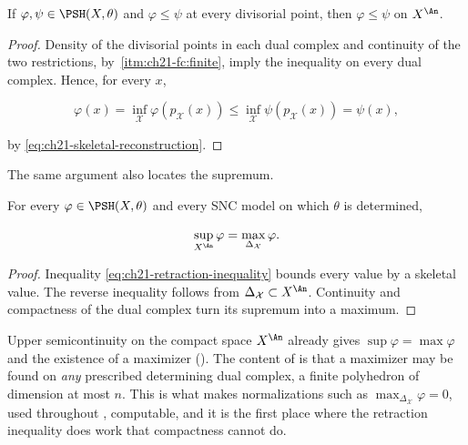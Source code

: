 \begin{proposition}\label{prop:ch21-divisorial-order}
If $\varphi,\psi\in\PSH(X,\theta)$ and
$\varphi\leq\psi$ at every divisorial point, then
$\varphi\leq\psi$ on $X^{\An}$.
\end{proposition}

\begin{proof}
Density of the divisorial points in each dual complex and continuity of the
two restrictions, by
\,\cref{itm:ch21-fc:finite}, imply the
inequality on every dual complex.  Hence,
for every $x$,

\[
 \varphi(x)
 =\inf_{\mathcal X}\varphi(p_{\mathcal X}(x))
 \leq\inf_{\mathcal X}\psi(p_{\mathcal X}(x))
 =\psi(x),
\]

by \eqref{eq:ch21-skeletal-reconstruction}.
\end{proof}

The same argument also locates the supremum.

\begin{proposition}\label{prop:ch21-sup-on-skeleton}
For every $\varphi\in\PSH(X,\theta)$ and every SNC model on which
$\theta$ is determined,

\begin{equation}
\label{eq:ch21-sup-on-skeleton}
             \sup_{X^{\An}}\varphi
             =\max_{\Delta_{\mathcal X}}\varphi.
\end{equation}
\end{proposition}

\begin{proof}
Inequality \eqref{eq:ch21-retraction-inequality} bounds every value by a
skeletal value.  The reverse inequality follows from
$\Delta_{\mathcal X}\subset X^{\An}$.  Continuity and compactness of the
dual complex turn its supremum into a maximum.
\end{proof}

\begin{remark}
\label{rem:ch21-sup-sharper}
Upper semicontinuity on the compact space $X^{\An}$ already gives
$\sup\varphi=\max\varphi$ and the existence of a maximizer
().  The content of
 is that a maximizer may be found on
\emph{any} prescribed determining dual complex, a finite polyhedron of
dimension at most $n$.  This is what makes normalizations such as
$\max_{\Delta_{\mathcal X}}\varphi=0$, used throughout
, computable, and it is the first place where the
retraction inequality does work that compactness cannot do.
\end{remark}

